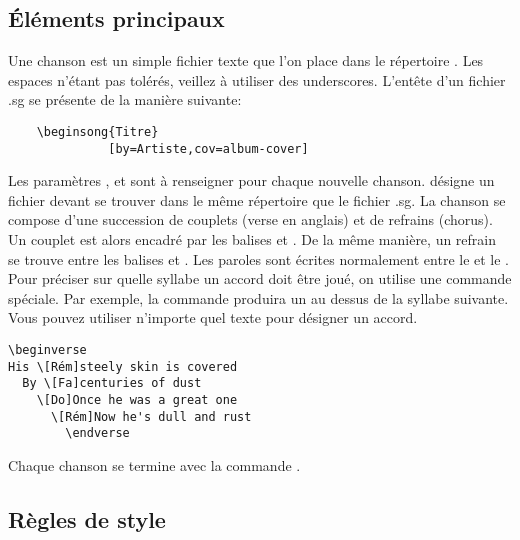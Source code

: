 \documentclass[versionenligne]{patacrep}
\begin{document}
\subsection{Éléments principaux}

Une chanson est un simple fichier texte  que l'on
place dans le répertoire . Les espaces n'étant
pas tolérés, veillez à utiliser des underscores. L'entête d'un fichier
.sg se présente de la manière suivante:

\begin{verbatim}
    \beginsong{Titre}
              [by=Artiste,cov=album-cover]
\end{verbatim}

Les paramètres ,  et
 sont à renseigner pour chaque nouvelle
chanson.  désigne un fichier
 devant se trouver dans le même répertoire que
le fichier .sg.  La chanson se compose d'une succession de couplets
(verse en anglais) et de refrains (chorus). Un couplet est alors
encadré par les balises  et
. De la même manière, un refrain se trouve entre
les balises  et .  Les
paroles sont écrites normalement entre le  et le
. Pour préciser sur quelle syllabe un accord doit être
joué, on utilise une commande spéciale. Par exemple, la commande
\latexcom{[Mi]} produira un  au dessus de la syllabe
suivante. Vous pouvez utiliser n'importe quel texte pour désigner un
accord.

\begin{center}
\begin{verbatim}
\beginverse
His \[Rém]steely skin is covered
  By \[Fa]centuries of dust
    \[Do]Once he was a great one
      \[Rém]Now he's dull and rust
        \endverse
\end{verbatim}
\end{center}

Chaque chanson se termine avec la commande .

\subsection{Règles de style}\label{sect:about}
\end{document}
